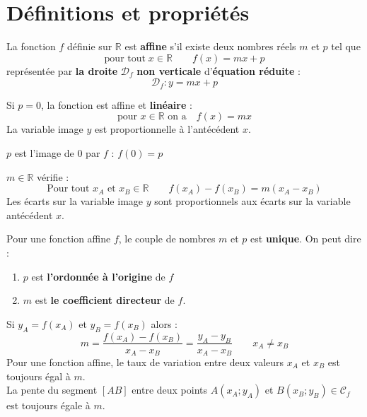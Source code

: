\documentclass[main.tex]{subfiles}
\begin{document}
\section{Définitions et propriétés}
\begin{definition} La fonction $f$ définie sur $\mathbb{R}$   
	est \textbf{affine}  
	s'il existe deux nombres réels $m$ et $p$ tel que 
	\setlength{\abovedisplayskip}{3pt}
	\setlength{\belowdisplayskip}{3pt}
	$$\text{pour tout} \;x\in\mathbb{R} \qquad f(x)=mx+p$$
représentée par \textbf{la droite} $\mathscr{D}_f$ \textbf{non verticale} d'\textbf{équation réduite} :
\setlength{\abovedisplayskip}{3pt}
\setlength{\belowdisplayskip}{3pt}
$$\mathscr{D}_f\colon y=mx+p$$   
\end{definition} 
\begin{definition} Si $p=0$, la fonction est affine et \textbf{linéaire} :
\setlength{\abovedisplayskip}{3pt}
\setlength{\belowdisplayskip}{3pt}
$$	\text{pour $x\in\mathbb{R}$ on a}\quad   f(x)=mx$$	 
La variable image $y$ est proportionnelle à l'antécédent $x$.
\end{definition} 
\begin{proposition} $p$ est l'image de $0$ par $f$ : $f(0)=p$
\end{proposition}
\begin{proposition} 
  $m\in\mathbb{R}$ vérifie :
	\setlength{\abovedisplayskip}{3pt}
	\setlength{\belowdisplayskip}{3pt}
	$$
	\text{Pour tout $x_A$ et $x_B\in\mathbb{R}$} \qquad f(x_A)-f(x_B)= m(x_A-x_B)
	$$ 
Les écarts sur la variable image $y$ sont proportionnels aux écarts sur la variable antécédent $x$.
\end{proposition}
\begin{property} Pour une fonction affine $f$, le couple de nombres $m$ et $p$ est \textbf{unique}. On peut dire :
	\begin{enumerate}[label=\textbullet, leftmargin=*]
		\item $p$ est \textbf{l'ordonnée à l'origine} de $f$
		\item $m$ est \textbf{le coefficient directeur} de $f$.
	\end{enumerate}  
\end{property}
\begin{property} Si $y_A=f(x_A)$ et $y_B=f(x_B)$ alors :
	\setlength{\abovedisplayskip}{3pt}
	\setlength{\belowdisplayskip}{3pt}
	$$
	m =\frac{f(x_A)-f(x_B)}{x_A-x_B}= \frac{y_A-y_B}{x_A-x_B}
	\qquad x_A\neq x_B 
	$$
Pour une fonction affine, le taux de variation entre deux valeurs $x_A$ et $x_B$ est toujours égal à  $m$.\\
La pente du segment $[AB]$ entre deux points  $A(x_A;y_A)$ et $B(x_B;y_B)\in \mathscr{C}_f$ est toujours égale à  $m$.
\end{property}
\end{document}
